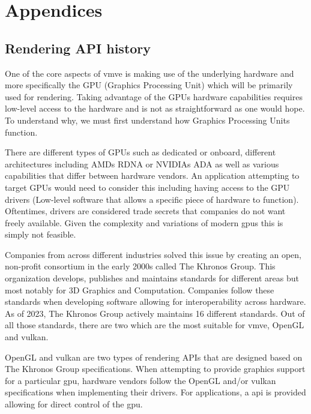 \documentclass[11pt]{article}
\begin{document}
\clearpage
\printnoidxglossary

\clearpage
\printnoidxglossary[type=\acronymtype]

\clearpage



\clearpage
\section{Appendices}

\subsection{Rendering API history} \label{rendering_api_appendix}
One of the core aspects of \gls{vmve} is making use of the underlying hardware and
more specifically the GPU (Graphics Processing Unit) which will be primarily
used for rendering. Taking advantage of the GPUs hardware capabilities requires
low-level access to the hardware and is not as straightforward as one would
hope. To understand why, we must first understand how Graphics Processing Units
function.

There are different types of GPUs such as dedicated or onboard, different
architectures including AMDs RDNA \cite{RDNA} or NVIDIAs ADA \cite{ADA} as well
as various capabilities that differ between hardware vendors. An application
attempting to target GPUs would need to consider this including having access to
the GPU drivers (Low-level software that allows a specific piece of hardware to
function). Oftentimes, drivers are considered trade secrets that companies do
not want freely available. Given the complexity and variations of modern
\glspl{gpu} this is simply not feasible.

Companies from across different industries solved this issue by creating
an open, non-profit consortium in the early 2000s called The Khronos Group. This
organization develops, publishes and maintains standards for different areas
but most notably for 3D Graphics and Computation. Companies follow these 
standards when developing software allowing for interoperability across
hardware. As of 2023, The Khronos Group actively maintains 16 different
standards. Out of all those standards, there are two which are the most
suitable for \gls{vmve}, OpenGL and \gls{vulkan}.

OpenGL and \gls{vulkan} are two types of rendering APIs that are designed based on
The Khronos Group specifications. When attempting to provide graphics support
for a particular \gls{gpu}, hardware vendors follow the OpenGL and/or \gls{vulkan}
specifications when implementing their drivers. For applications, a
\acrfull{api} is provided allowing for direct control of the \gls{gpu}.
\end{document}
